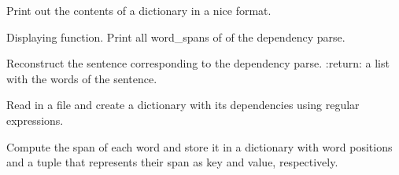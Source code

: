 \documentclass[letterpaper,10pt,english]{sphinxmanual}
\begin{document}
\begin{fulllineitems}
\begin{fulllineitems}
\label{dependencies:dependencies.Dependencies.print_labels}
Print out the contents of a dictionary
in a nice format.

\end{fulllineitems}


\begin{fulllineitems}
\label{dependencies:dependencies.Dependencies.print_spans}
Displaying function. Print all
word\_spans of of the dependency parse.

\end{fulllineitems}


\begin{fulllineitems}
\label{dependencies:dependencies.Dependencies.reconstruct_sentence}
Reconstruct the sentence corresponding to the 
dependency parse.
:return:        a list with the words of the sentence.

\end{fulllineitems}


\begin{fulllineitems}
\label{dependencies:dependencies.Dependencies.set_dependencies}
Read in a file and create a dictionary
with its dependencies using regular expressions.

\end{fulllineitems}


\begin{fulllineitems}
\label{dependencies:dependencies.Dependencies.set_wordspans}
Compute the span of each word and store it in a
dictionary with word positions and a tuple that
represents their span as key and value, respectively.

\end{fulllineitems}


\end{fulllineitems}
\end{document}
